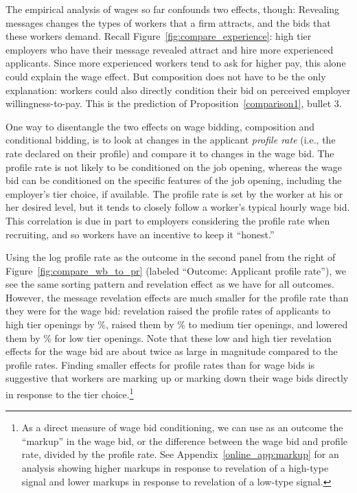 \documentclass[12pt]{article}
\begin{document}
The empirical analysis of wages so far confounds two effects, though: Revealing messages changes the types of workers that a firm attracts, and the bids that these workers demand. Recall Figure~\ref{fig:compare_experience}:
high tier employers who have their message revealed attract and hire more experienced applicants. Since more experienced workers tend to ask for higher pay, this alone could explain the wage effect. But composition does not have to be the only explanation: workers could also directly condition their bid on perceived employer willingness-to-pay.
This is the prediction of Proposition~\ref{comparison1}, bullet 3. 

One way to disentangle the two effects on wage bidding, composition and conditional bidding, is to look at changes in the applicant {\em profile rate} (i.e., the rate declared on their profile) and compare it to changes in the wage bid.
The profile rate is not likely to be conditioned on the job opening, whereas the wage bid can be conditioned on the specific features of the job opening, including the employer's tier choice, if available. 
The profile rate is set by the worker at his or her desired level, but it tends to closely follow a worker's typical hourly wage bid.
This correlation is due in part to employers considering the profile rate when recruiting, and so workers have an incentive to keep it ``honest.''

Using the log profile rate as the outcome in the second panel from the right of Figure~\ref{fig:compare_wb_to_pr} (labeled ``Outcome: Applicant profile rate''), we see the same sorting pattern and revelation effect as we have for all outcomes.
However, the message revelation effects are much smaller for the profile rate than they were for the wage bid: 
revelation raised the profile rates of applicants to high tier openings by \EffectProfileRateAppHighTierRegression{}\%, raised them by \EffectProfileRateAppMedTierRegression{}\% to medium tier openings, and lowered them by \EffectProfileRateAppLowTierRegression{}\% for low tier openings.
Note that these low and high tier revelation effects for the wage bid are about twice as large in magnitude compared to the profile rates. 
Finding smaller effects for profile rates than for wage bids is suggestive that workers are marking up or marking down their wage bids directly in response to the tier choice.\footnote{
  As a direct measure of wage bid conditioning, we can use as an outcome the ``markup'' in the wage bid, or the difference between the wage bid and profile rate, divided by the profile rate.
  See Appendix~\ref{online_app:markup} for an analysis showing higher markups in response to revelation of a high-type signal and lower markups in response to revelation of a low-type signal.
}
\end{document}
